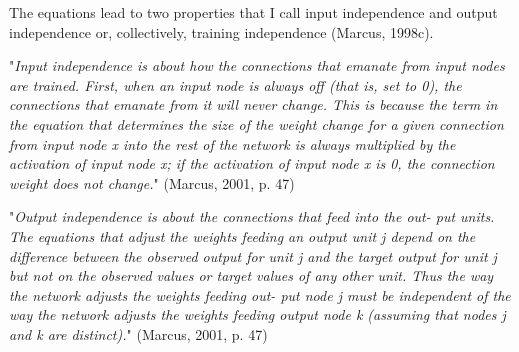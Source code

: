 \documentclass[../../main.tex]{subfiles}
\begin{document}
\begin{citecallout}
    The equations lead to two properties that I call input independence and
    output independence or, collectively, training independence (Marcus, 1998c).
\end{citecallout}

\begin{definition}
    "\emph{Input independence is about how the connections that emanate from input nodes are trained. First, when an input node is always off (that is, set
    to 0), the connections that emanate from it will never change. This is
    because the term in the equation that determines the size of the weight
    change for a given connection from input node x into the rest of the network is always multiplied by the activation of input node x; if the activation of input node x is 0, the connection weight does not change.}" (Marcus, 2001, p. 47)
\end{definition}

\begin{definition}
    "\emph{Output independence is about the connections that feed into the out-
    put units. The equations that adjust the weights feeding an output unit
    j depend on the difference between the observed output for unit j and
    the target output for unit j but not on the observed values or target values of
    any other unit. Thus the way the network adjusts the weights feeding out-
    put node j must be independent of the way the network adjusts the
    weights feeding output node k (assuming that nodes j and k are distinct).}" (Marcus, 2001, p. 47)
\end{definition}
\end{document}
